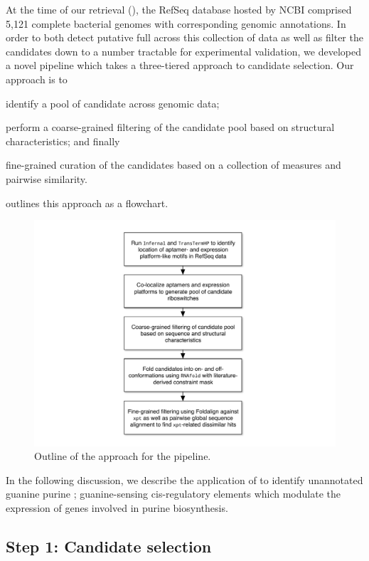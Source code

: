 At the time of our retrieval (\fnaRetrievalTime), the RefSeq database hosted by
NCBI comprised 5,121 complete bacterial genomes with corresponding genomic
annotations. In order to both detect putative full \rbs across this
collection of data as well as filter the candidates down to a number tractable for
experimental validation, we developed a novel pipeline which takes a three-tiered
approach to candidate selection. Our approach is to
\begin{inparaenum}[\em 1\upshape)]
\item identify a pool of candidate \rbs across genomic data;
\item perform a coarse-grained filtering of the candidate pool based on structural
characteristics; and finally
\item fine-grained curation of the candidates based on a collection of measures
and pairwise similarity.
\end{inparaenum}  outlines this approach as a
flowchart.

\begin{figure}[!ht]
\centering
\includegraphics[width=.9\textwidth]{Figures/Ribofinder/ribofinderOverview.pdf}
\caption{Outline of the approach for the \rfinder pipeline.}
\label{fig:rfinder:flowchart}
\end{figure}

In the following discussion, we describe the application of \rfinder to identify
unannotated guanine purine \rbs; guanine-sensing cis-regulatory elements
which modulate the expression of genes involved in purine biosynthesis.

\subsection{Step 1: Candidate selection}
\label{subsec:rfinder:selection}

